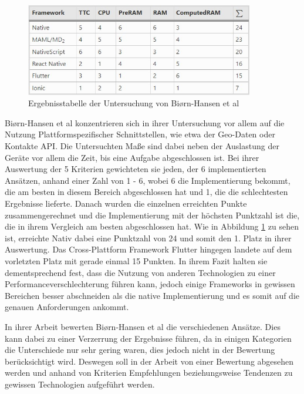 \begin{figure}[ht]
  \centering
  \includegraphics[width=10cm,keepaspectratio]{images/Biorn-Hansen_Result_table.jpg}
  \caption{Ergebnisstabelle der Untersuchung von Biørn-Hansen et al \cite{BirnHansen.2020}}
  \label{fig:result_table_Biorn}
\end{figure}

Biørn-Hansen et al \cite{BirnHansen.2020} konzentrieren sich in ihrer Untersuchung vor allem auf die Nutzung Plattformspezifischer Schnittstellen, wie etwa der Geo-Daten oder Kontakte \ac{API}. Die Untersuchten Maße sind dabei neben der Auslastung der Geräte vor allem die Zeit, bis eine Aufgabe abgeschlossen ist. Bei ihrer Auswertung der 5 Kriterien gewichteten sie jeden, der 6 implementierten Ansätzen, anhand einer Zahl von 1 - 6, wobei 6 die Implementierung bekommt, die am besten in diesem Bereich abgeschlossen hat und 1, die die schlechtesten Ergebnisse lieferte. Danach wurden die einzelnen erreichten Punkte zusammengerechnet und die Implementierung mit der höchsten Punktzahl ist die, die in ihrem Vergleich am besten abgeschlossen hat. Wie in Abbildung \ref{fig:result_table_Biorn} zu sehen ist, erreichte Nativ dabei eine Punktzahl von 24 und somit den 1. Platz in ihrer Auswertung. Das Cross-Plattform Framework Flutter hingegen landete auf dem vorletzten Platz mit gerade einmal 15 Punkten. In ihrem Fazit halten sie dementsprechend fest, dass die Nutzung von anderen Technologien zu einer Performanceverschlechterung führen kann, jedoch einige Frameworks in gewissen Bereichen besser abschneiden als die native Implementierung und es somit auf die genauen Anforderungen ankommt.

In ihrer Arbeit bewerten Biørn-Hansen et al die verschiedenen Ansätze. Dies kann dabei zu einer Verzerrung der Ergebnisse führen, da in einigen Kategorien die Unterschiede nur sehr gering waren, dies jedoch nicht in der Bewertung berücksichtigt wird. Deswegen soll in der Arbeit von einer Bewertung abgesehen werden und anhand von Kriterien Empfehlungen beziehungsweise Tendenzen zu gewissen Technologien aufgeführt werden.

